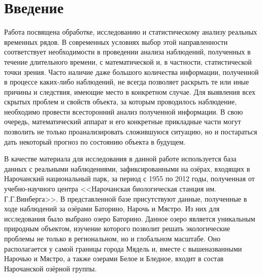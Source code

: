 
\newpage

\chapter*{Введение}

Работа посвящена обработке, исследованию и статистическому анализу реальных временных рядов. В современных условиях выбор этой направленности соответствует необходимости в проведении анализа наблюдений, полученных в течение длительного времени, с математической и, в частности, статистической точки зрения. Часто наличие даже большого количества информации, полученной в процессе каких-либо наблюдений, не всегда позволяет раскрыть те или иные причины и следствия, имеющие место в конкретном случае. Для выявления всех скрытых проблем и свойств объекта, за которым проводилось наблюдение, необходимо провести всесторонний анализ полученной информации. В свою очередь, математический аппарат и его конкретные прикладные части могут позволить не только проанализировать сложившуюся ситуацию, но и постараться дать некоторый прогноз по состоянию объекта в будущем.

В качестве материала для исследования в данной работе используется база данных с реальными наблюдениями, зафиксированными на озёрах, входящих в Нарочанский национальный парк, за период с 1955 по 2012 годы, полученная от учебно-научного центра <<Нарочанская биологическая станция им. Г.Г.Винберга>>. В представленной базе присутствуют данные, полученные в ходе наблюдений за озёрами Баторино, Нарочь и Мястро. Из них для исследования было выбрано озеро Баторино. Данное озеро является уникальным природным объектом, изучение которого позволит решать экологические проблемы не только в региональном, но и глобальном масштабе. Оно располагается у самой границы города Мядель и, вместе с вышеназванными Нарочью и Мястро, а также озерами Белое и Бледное, входит в состав Нарочанской озёрной группы.

